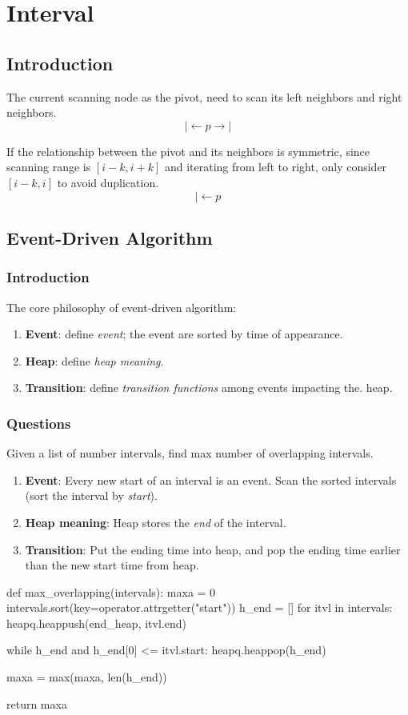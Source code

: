 \chapter{Interval}


\section{Introduction}
 The current scanning node as the pivot, need to scan its left neighbors and right neighbors. 
$$
|\leftarrow p \rightarrow |
$$

If the relationship between the pivot and its neighbors is symmetric, since scanning range is $[i-k, i+k]$ and iterating from left to right, only consider $[i-k, i]$ to avoid duplication.
$$
|\leftarrow p
$$

\section{Event-Driven Algorithm}
\subsection{Introduction}
The core philosophy of event-driven algorithm:
\begin{enumerate}
\item \textbf{Event}: define \textit{event}; the event are sorted by time of appearance.
\item \textbf{Heap}: define \textit{heap meaning}.
\item \textbf{Transition}: define \textit{transition functions} among events impacting the.
heap. 
\end{enumerate} 

\subsection{Questions}
 Given a list of number intervals, find max number of overlapping
intervals. 
\begin{enumerate}
\item \textbf{Event}: Every new start of an interval is an event. Scan the sorted intervals (sort the interval by \textit{start}).
\item \textbf{Heap meaning}: Heap stores the \textit{end} of the interval. 
\item \textbf{Transition}: Put the ending time into heap, and pop the ending time earlier than the new start time from heap.
\end{enumerate}
\newpage
\begin{python}
def max_overlapping(intervals):
    maxa = 0
    intervals.sort(key=operator.attrgetter("start"))
    h_end = []
    for itvl in intervals:
        heapq.heappush(end_heap, itvl.end)
        
        while h_end and h_end[0] <= itvl.start:
            heapq.heappop(h_end)

        maxa = max(maxa, len(h_end))

    return maxa
\end{python}

